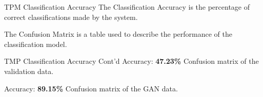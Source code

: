 \begin{frame}{TPM \textemdash{} Classification Accuracy}
    The Classification Accuracy is the percentage of correct classifications made by the system.

    \vspace*{.5cm}
    The Confusion Matrix is a table used to describe the performance of the classification model.
\end{frame}
\begin{frame}{TMP \textemdash{} Classification Accuracy \textemdash{} Cont'd}
    Accuracy: \textbf{47.23\%}
    Confusion matrix of the validation data. 
    \begin{table}[!htbp]
        \centering
    \end{table}

    Accuracy: \textbf{89.15\%}
    Confusion matrix of the GAN data. 
    \begin{table}[!htbp]
        \centering
    \end{table}    
\end{frame}


